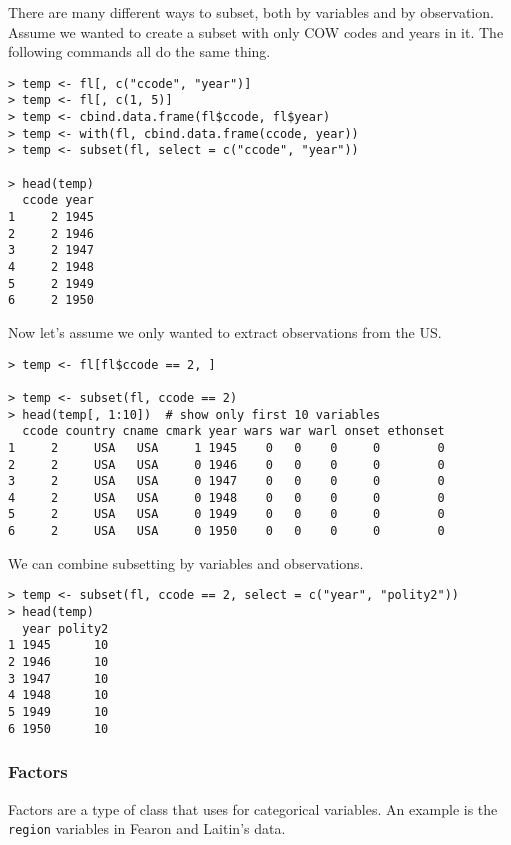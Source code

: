 There are many different ways to subset, both by variables and by observation. Assume we wanted to create a subset with only COW codes and years in it. The following commands all do the same thing.

\begin{lstlisting}
> temp <- fl[, c("ccode", "year")]
> temp <- fl[, c(1, 5)]
> temp <- cbind.data.frame(fl$ccode, fl$year)
> temp <- with(fl, cbind.data.frame(ccode, year))
> temp <- subset(fl, select = c("ccode", "year"))

> head(temp)
  ccode year
1     2 1945
2     2 1946
3     2 1947
4     2 1948
5     2 1949
6     2 1950
\end{lstlisting}

Now let's assume we only wanted to extract observations from the US.

\begin{lstlisting}
> temp <- fl[fl$ccode == 2, ]

> temp <- subset(fl, ccode == 2)
> head(temp[, 1:10])  # show only first 10 variables
  ccode country cname cmark year wars war warl onset ethonset
1     2     USA   USA     1 1945    0   0    0     0        0
2     2     USA   USA     0 1946    0   0    0     0        0
3     2     USA   USA     0 1947    0   0    0     0        0
4     2     USA   USA     0 1948    0   0    0     0        0
5     2     USA   USA     0 1949    0   0    0     0        0
6     2     USA   USA     0 1950    0   0    0     0        0
\end{lstlisting}

We can combine subsetting by variables and observations.

\begin{lstlisting}
> temp <- subset(fl, ccode == 2, select = c("year", "polity2"))
> head(temp)
  year polity2
1 1945      10
2 1946      10
3 1947      10
4 1948      10
5 1949      10
6 1950      10
\end{lstlisting}

\subsubsection*{Factors}

Factors are a type of class that \R uses for categorical variables. An example is the \texttt{region} variables in Fearon and Laitin's data.

